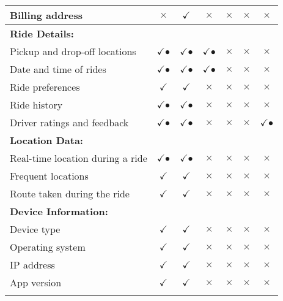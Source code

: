 \begin{table}
\begin{tabular}{|l|c|c|c|c|c|c|}
\hline
Billing address & $\times$ & $\checkmark$ & $\times$ & $\times$ & $\times$ & $\times$ \\
\hline
\multicolumn{1}{|l|}{\textbf{Ride Details:}} & \multicolumn{1}{c}{} & \multicolumn{1}{c}{} & \multicolumn{1}{c}{} & \multicolumn{1}{c}{} & \multicolumn{1}{c}{} & \multicolumn{1}{c|}{} \\
\hline
Pickup and drop-off locations & $\checkmark$$\bullet$ & $\checkmark$$\bullet$ & $\checkmark$$\bullet$ & $\times$ & $\times$ & $\times$ \\
\hline
Date and time of rides & $\checkmark$$\bullet$ & $\checkmark$$\bullet$ & $\checkmark$$\bullet$ & $\times$ & $\times$ & $\times$ \\
\hline
Ride preferences & $\checkmark$ & $\checkmark$ & $\times$ & $\times$ & $\times$ & $\times$ \\
\hline
Ride history & $\checkmark$$\bullet$ & $\checkmark$$\bullet$ & $\times$ & $\times$ & $\times$ & $\times$ \\
\hline
Driver ratings and feedback & $\checkmark$$\bullet$ & $\checkmark$$\bullet$ & $\times$ & $\times$ & $\times$ & $\checkmark$$\bullet$ \\
\hline
\multicolumn{1}{|l|}{\textbf{Location Data: }} & \multicolumn{1}{c}{} & \multicolumn{1}{c}{} & \multicolumn{1}{c}{} & \multicolumn{1}{c}{} & \multicolumn{1}{c}{} & \multicolumn{1}{c|}{} \\
\hline
Real-time location during a ride & $\checkmark$$\bullet$ & $\checkmark$$\bullet$ & $\times$ & $\times$ & $\times$ & $\times$ \\
\hline
Frequent locations & $\checkmark$ & $\checkmark$ & $\times$ & $\times$ & $\times$ & $\times$ \\
\hline
Route taken during the ride & $\checkmark$ & $\checkmark$ & $\times$ & $\times$ & $\times$ & $\times$ \\
\hline
\multicolumn{1}{|l|}{\textbf{Device Information: }} & \multicolumn{1}{c}{} & \multicolumn{1}{c}{} & \multicolumn{1}{c}{} & \multicolumn{1}{c}{} & \multicolumn{1}{c}{} & \multicolumn{1}{c|}{} \\
\hline
Device type & $\checkmark$ & $\checkmark$ & $\times$ & $\times$ & $\times$ & $\times$ \\
\hline
Operating system & $\checkmark$ & $\checkmark$ & $\times$ & $\times$ & $\times$ & $\times$ \\
\hline
IP address & $\checkmark$ & $\checkmark$ & $\times$ & $\times$ & $\times$ & $\times$ \\
\hline
App version & $\checkmark$ & $\checkmark$ & $\times$ & $\times$ & $\times$ & $\times$ \\
$$
\end{tabular}
\end{table}
